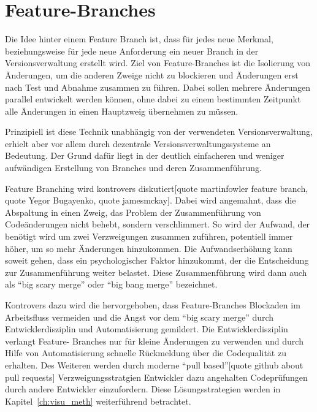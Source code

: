 \section{Feature-Branches}

Die Idee hinter einem Feature Branch ist, dass für jedes neue Merkmal, beziehungsweise für jede neue Anforderung ein 
neuer Branch in der Versionsverwaltung erstellt wird. Ziel von Feature-Branches ist die Isolierung von Änderungen, um die 
anderen Zweige nicht zu blockieren und Änderungen erst nach Test und Abnahme zusammen zu führen. Dabei sollen mehrere 
Änderungen parallel entwickelt werden können, ohne dabei zu einem bestimmten Zeitpunkt alle Änderungen in einen 
Hauptzweig übernehmen zu müssen.

Prinzipiell ist diese Technik unabhängig von der verwendeten Versionsverwaltung, erhielt aber vor allem durch dezentrale 
Versionsverwaltungssysteme an Bedeutung. Der Grund dafür liegt in der deutlich einfacheren und weniger aufwändigen 
Erstellung von Branches und deren Zusammenführung.

Feature Branching wird kontrovers diskutiert[quote martinfowler feature branch, quote Yegor Bugayenko, quote jamesmckay]. 
Dabei wird angemahnt, dass die Abspaltung in einen Zweig, das Problem der Zusammenführung von Codeänderungen nicht 
behebt, sondern verschlimmert. So wird der Aufwand, der benötigt wird um zwei Verzweigungen zusammen zuführen, potentiell 
immer höher, um so mehr Änderungen hinzukommen. Die Aufwandserhöhung kann soweit gehen, dass ein psychologischer Faktor 
hinzukommt, der die Entscheidung zur Zusammenführung weiter belastet. Diese Zusammenführung wird dann auch als ``big 
scary merge'' oder ``big bang merge'' bezeichnet.

Kontrovers dazu wird die hervorgehoben, dass Feature-Branches Blockaden im Arbeitsfluss vermeiden und die Angst vor dem 
``big scary merge'' durch Entwicklerdisziplin und Automatisierung gemildert. Die Entwicklerdisziplin verlangt Feature-
Branches nur für kleine Änderungen zu verwenden und durch Hilfe von Automatisierung schnelle Rückmeldung über die 
Codequalität zu erhalten. Des Weiteren werden durch moderne ``pull based''[quote github about pull requests] 
Verzweigungsstratgien Entwickler dazu angehalten Codeprüfungen durch andere Entwickler einzufordern. Diese 
Lösungsstrategien werden in Kapitel~\ref{ch:visu_meth} weiterführend betrachtet.